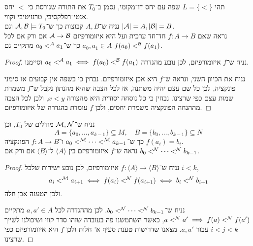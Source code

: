 \question{}
\subquestion{}
תהי $L = \{ < \}$ שפה עם יחס דו־מקומי, נסמן ב־$T_0$ את התורה שגורסת כי $<$ יחס אנטי־רפלקסיבי, טרנזיטיבי וקווי. \\
נניח ש־$A, B$ קבוצות כך ש־$\mathcal{A}, \mathcal{B} \models T_0$ וגם $|\mathcal{A}| = A, |\mathcal{B}| = B$. \\
נראה שאם $f : A \to B$ חד־חד ערכית ועל היא איזומורפיזם $\mathcal{A} \to \mathcal{B}$ אם ורק אם לכל $a_0, a_1 \in A$ כך ש־$a_0 <^{\mathcal{A}} a_1$ מתקיים גם $f(a_0) <^{\mathcal{B}} f(a_1)$.
\begin{proof}
	נניח ש־$f$ איזומורפיזם, לכן נובע מהגדרה $a_0 <^{\mathcal{A}} a_1 \iff f(a_0) <^{\mathcal{B}} f(a_1)$ וסיימנו.

	נניח את הכיוון השני, ונראה ש־$f$ היא אכן איזומורפיזם.
	נבחין כי בשפה אין קבועים או סימני פונקציה, לכן כל שם עצם יהיה משתנה, אז לכל הצבה שהיא מהנתון נקבל ש־$f$ משמרת שמות עצם כפי שרצינו.
	נבחין כי כל נוסחה יסודית היא מהצורה $x < y$, ולכן לכל הצבה מההנחה הפונקציה משמרת יחסים, ולכן $f$ עומדת בהגדרה של איזומורפיזם.
\end{proof}

\subquestion{}
נניח ש־$\mathcal{M}, \mathcal{N}$ מודלים של $T_0$, וכן
\[
	A = \{ a_0, \dots, a_{k - 1} \} \subseteq M,
	\quad
	B = \{ b_0, \dots, b_{k - 1} \} \subseteq N
\]
כך ש־$a_0 <^{\mathcal{M}} \cdots <^{\mathcal{M}} a_{k - 1}$ ו־$f : A \to B$ הפונקציה $f(a_i) = b_i$. \\
נראה ש־$f$ איזומורפיזם בין $\langle A \rangle$ ל־$\langle B \rangle$ אם ורק אם $b_0 <^{\mathcal{N}} \cdots <^{\mathcal{N}} b_{k - 1}$.
\begin{proof}
	נניח ש־$f : \langle A \rangle \to \langle B \rangle$ איזומורפיזם, לכן נובע ישירות שלכל $i < k$,
	\[
		a_i <^{\mathcal{M}} a_{i + 1}
		\iff f(a_i) <^{\mathcal{N}} f(a_{i + 1})
		\iff b_i <^{\mathcal{N}} b_{i + 1}
	\]
	ולכן הטענה אכן חלה.

	נניח ש־$b_0 <^{\mathcal{N}} \cdots <^{\mathcal{N}} b_{k - 1}$.
	לכן מההגדרה לכל $a, a' \in A$ מתקיים $a <^{\mathcal{N}} a' \implies f(a) <^{\mathcal{N}} f(a')$, כאשר השתמשנו פה בעובדה שזהו סדר קווי ושיכולנו לשייך $i < j < k$ עבור $a, a'$.
	מצאנו שדרישות טענת סעיף א' חלות ולכן $f$ היא איזומורפיזם כפי שרצינו.
\end{proof}

